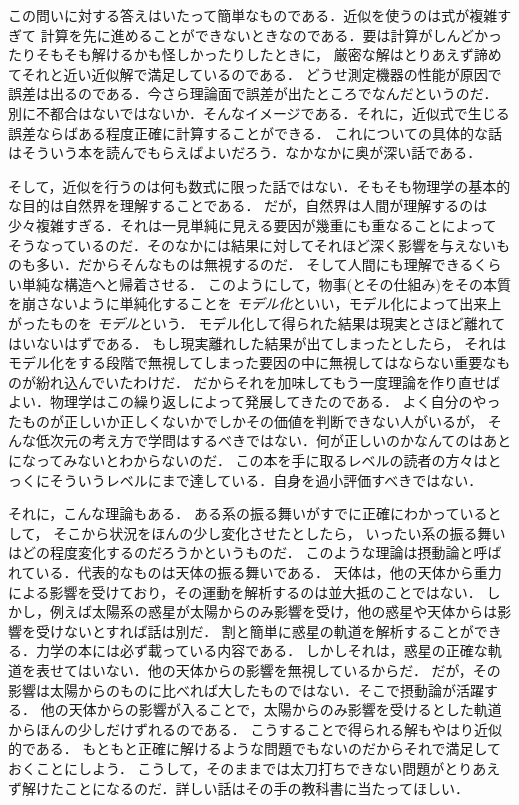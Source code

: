 この問いに対する答えはいたって簡単なものである．近似を使うのは式が複雑すぎて
計算を先に進めることができないときなのである．要は計算がしんどかったりそもそも解けるかも怪しかったりしたときに，
厳密な解はとりあえず諦めてそれと近い近似解で満足しているのである．
どうせ測定機器の性能が原因で誤差は出るのである．今さら理論面で誤差が出たところでなんだというのだ．
別に不都合はないではないか．そんなイメージである．それに，近似式で生じる誤差ならばある程度正確に計算することができる．
これについての具体的な話はそういう本を読んでもらえばよいだろう．なかなかに奥が深い話である．

そして，近似を行うのは何も数式に限った話ではない．そもそも物理学の基本的な目的は自然界を理解することである．
だが，自然界は人間が理解するのは少々複雑すぎる．それは一見単純に見える要因が幾重にも重なることによって
そうなっているのだ．そのなかには結果に対してそれほど深く影響を与えないものも多い．だからそんなものは無視するのだ．
そして人間にも理解できるくらい単純な構造へと帰着させる．
このようにして，物事(とその仕組み)をその本質を崩さないように単純化することを
\emph{モデル化}といい，モデル化によって出来上がったものを
\emph{モデル}という．
モデル化して得られた結果は現実とさほど離れてはいないはずである．
もし現実離れした結果が出てしまったとしたら，
それはモデル化をする段階で無視してしまった要因の中に無視してはならない重要なものが紛れ込んでいたわけだ．
だからそれを加味してもう一度理論を作り直せばよい．物理学はこの繰り返しによって発展してきたのである．
よく自分のやったものが正しいか正しくないかでしかその価値を判断できない人がいるが，
そんな低次元の考え方で学問はするべきではない．何が正しいのかなんてのはあとになってみないとわからないのだ．
この本を手に取るレベルの読者の方々はとっくにそういうレベルにまで達している．自身を過小評価すべきではない．

それに，こんな理論もある．
ある系の振る舞いがすでに正確にわかっているとして， そこから状況をほんの少し変化させたとしたら，
いったい系の振る舞いはどの程度変化するのだろうかというものだ．
このような理論は摂動論と呼ばれている．代表的なものは天体の振る舞いである．
天体は，他の天体から重力による影響を受けており，その運動を解析するのは並大抵のことではない．
しかし，例えば太陽系の惑星が太陽からのみ影響を受け，他の惑星や天体からは影響を受けないとすれば話は別だ．
割と簡単に惑星の軌道を解析することができる．力学の本には必ず載っている内容である．
しかしそれは，惑星の正確な軌道を表せてはいない．他の天体からの影響を無視しているからだ．
だが，その影響は太陽からのものに比べれば大したものではない．そこで摂動論が活躍する．
他の天体からの影響が入ることで，太陽からのみ影響を受けるとした軌道からほんの少しだけずれるのである．
こうすることで得られる解もやはり近似的である．
もともと正確に解けるような問題でもないのだからそれで満足しておくことにしよう．
こうして，そのままでは太刀打ちできない問題がとりあえず解けたことになるのだ．詳しい話はその手の教科書に当たってほしい．
